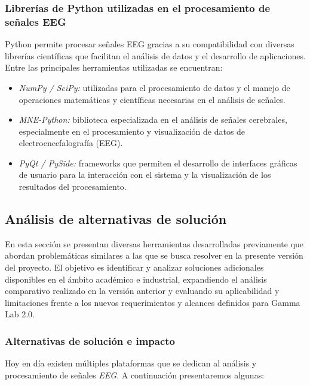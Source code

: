 \documentclass[12pt,letterpaper]{article}
\begin{document}
\subsubsection{Librerías de Python utilizadas en el procesamiento de señales EEG}
Python permite procesar señales EEG gracias a su compatibilidad con diversas librerías científicas que facilitan el análisis de datos y el desarrollo de aplicaciones. Entre las principales herramientas utilizadas se encuentran:
\begin{itemize}
    \item \textit{NumPy / SciPy:} utilizadas para el procesamiento de datos y el manejo de operaciones matemáticas y científicas necesarias en el análisis de señales.\cite{morris_31_2025}
    \item \textit{MNE-Python:} biblioteca especializada en el análisis de señales cerebrales, especialmente en el procesamiento y visualización de datos de electroencefalografía (EEG).\cite{noauthor_mne_nodate}
    \item \textit{PyQt / PySide:} frameworks que permiten el desarrollo de interfaces gráficas de usuario para la interacción con el sistema y la visualización de los resultados del procesamiento.\cite{noauthor_qt_nodate}
\end{itemize}

\subsection{Análisis de alternativas de solución}

En esta sección se presentan diversas herramientas desarrolladas previamente que abordan problemáticas similares a las que se busca resolver en la presente versión del proyecto. El objetivo es identificar y analizar soluciones adicionales disponibles en el ámbito académico e industrial, expandiendo el análisis comparativo realizado en la versión anterior y evaluando su aplicabilidad y limitaciones frente a los nuevos requerimientos y alcances definidos para Gamma Lab 2.0.

\subsubsection{Alternativas de solución e impacto}

Hoy en día existen múltiples plataformas que se dedican al análisis y procesamiento de señales \textit{EEG}. A continuación presentaremos algunas:
\end{document}
